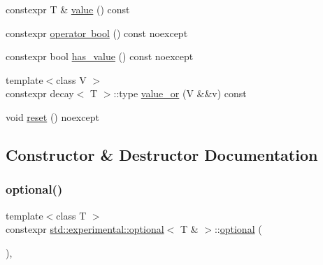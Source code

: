 \begin{DoxyCompactItemize}
constexpr T \& \mbox{\hyperlink{classstd_1_1experimental_1_1optional_3_01_t_01_6_01_4_a26bcfd23d34cf8fa4e875182b0509880}{value}} () const
\item 
constexpr \mbox{\hyperlink{classstd_1_1experimental_1_1optional_3_01_t_01_6_01_4_af97cf69395346a676ba8d9deba19b1fe}{operator bool}} () const noexcept
\item 
constexpr bool \mbox{\hyperlink{classstd_1_1experimental_1_1optional_3_01_t_01_6_01_4_a8fe2e183adab1f3dfbe8d4e09688d5ae}{has\+\_\+value}} () const noexcept
\item 
{\footnotesize template$<$class V $>$ }\\constexpr decay$<$ T $>$\+::type \mbox{\hyperlink{classstd_1_1experimental_1_1optional_3_01_t_01_6_01_4_a94a0ddc8d79f9118e9271a17858ca632}{value\+\_\+or}} (V \&\&v) const
\item 
void \mbox{\hyperlink{classstd_1_1experimental_1_1optional_3_01_t_01_6_01_4_a88cda3166b485696833779d31342719c}{reset}} () noexcept
\end{DoxyCompactItemize}


\subsection{Constructor \& Destructor Documentation}
\mbox{\label{classstd_1_1experimental_1_1optional_3_01_t_01_6_01_4_af1ca4fe03c90cf9cb58e65fde8fd103f}} 
\subsubsection{\texorpdfstring{optional()}{optional()}\hspace{0.1cm}{\footnotesize\ttfamily [1/7]}}
{\footnotesize\ttfamily template$<$class T $>$ \\
constexpr \mbox{\hyperlink{classstd_1_1experimental_1_1optional}{std\+::experimental\+::optional}}$<$ T \& $>$\+::\mbox{\hyperlink{classstd_1_1experimental_1_1optional}{optional}} (\begin{DoxyParamCaption}{ }\end{DoxyParamCaption})\hspace{0.3cm}{\ttfamily [inline]}, {\ttfamily [noexcept]}}

